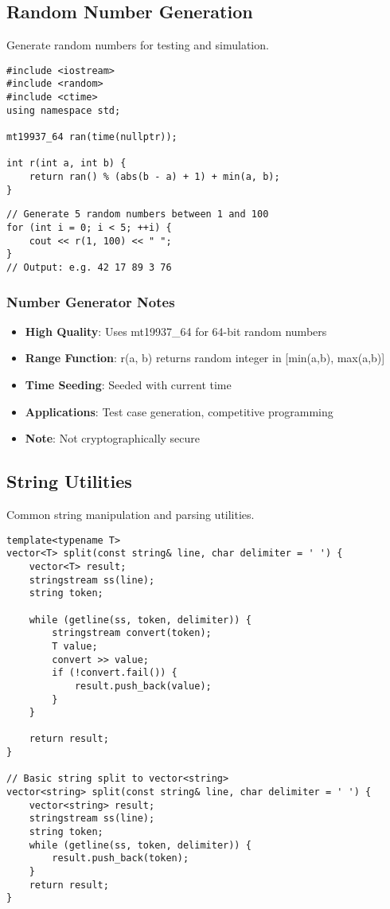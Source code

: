 \documentclass[11pt,a4paper]{article}
\begin{document}
\newpage
\subsection{Random Number Generation}
Generate random numbers for testing and simulation.

\begin{lstlisting}[caption={Random Number Generator}]
#include <iostream>
#include <random>
#include <ctime>
using namespace std;

mt19937_64 ran(time(nullptr));

int r(int a, int b) {
    return ran() % (abs(b - a) + 1) + min(a, b);
}
\end{lstlisting}

\begin{lstlisting}[caption={Random Number Generator Example Usage}]
// Generate 5 random numbers between 1 and 100
for (int i = 0; i < 5; ++i) {
    cout << r(1, 100) << " ";
}
// Output: e.g. 42 17 89 3 76
\end{lstlisting}

\subsubsection{Number Generator Notes}
\begin{itemize}
\item \textbf{High Quality}: Uses mt19937\_64 for 64-bit random numbers
\item \textbf{Range Function}: r(a, b) returns random integer in [min(a,b), max(a,b)]
\item \textbf{Time Seeding}: Seeded with current time
\item \textbf{Applications}: Test case generation, competitive programming
\item \textbf{Note}: Not cryptographically secure
\end{itemize}

\newpage
\subsection{String Utilities}
Common string manipulation and parsing utilities.

\begin{lstlisting}[caption={String Split Utility}]
template<typename T>
vector<T> split(const string& line, char delimiter = ' ') {
    vector<T> result;
    stringstream ss(line);
    string token;

    while (getline(ss, token, delimiter)) {
        stringstream convert(token);
        T value;
        convert >> value;
        if (!convert.fail()) {
            result.push_back(value);
        }
    }

    return result;
}

// Basic string split to vector<string>
vector<string> split(const string& line, char delimiter = ' ') {
    vector<string> result;
    stringstream ss(line);
    string token;
    while (getline(ss, token, delimiter)) {
        result.push_back(token);
    }
    return result;
}
\end{lstlisting}
\end{document}
